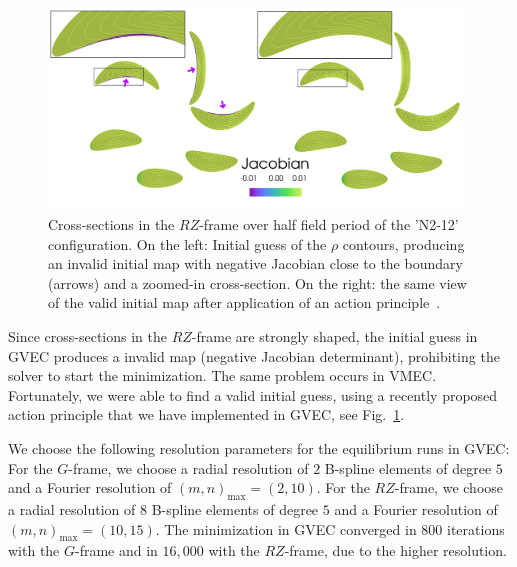\documentclass[12pt]{iopart}
\newcommand\GFF{$G$-frame}
\newcommand\RZF{$RZ$-frame}
\begin{document}
\begin{figure}[htbp!]
    \centering
    \includegraphics[width=0.98\textwidth]{pics/action_min_init_final_zoom.png}
    \caption{Cross-sections in the \RZF{} over half field period of the 'N2-12' configuration. On the left: Initial guess of the $\rho$ contours, producing an invalid initial map with negative Jacobian close to the boundary (arrows) and a zoomed-in cross-section. On the right: the same view of the valid initial map after application of an action principle~\cite{tecchiolli_constructing_2024}.} 
    \label{fig:action_min}  
\end{figure}

Since cross-sections in the \RZF{} are strongly shaped, the initial guess in GVEC produces a invalid map (negative Jacobian determinant), prohibiting the solver to start the minimization. The same problem occurs in VMEC. Fortunately, we were able to find a valid initial guess, using a recently proposed action principle \cite{tecchiolli_constructing_2024} that we have implemented in GVEC, see Fig.~\ref{fig:action_min}. 

We choose the following resolution parameters for the equilibrium runs in GVEC: 
For the  \GFF{}, we choose a radial resolution of $2$ B-spline elements of degree $5$ and a Fourier resolution of $(m,n)_\text{max}=(2,10)$. 
For the \RZF{}, we choose a radial resolution of $8$ B-spline elements of degree $5$ and a Fourier resolution of $(m,n)_\text{max}=(10,15)$. 
The  minimization in GVEC converged in $800$ iterations with the \GFF{} and in  $16,000$ with the \RZF{}, due to the higher resolution. 
\end{document}
